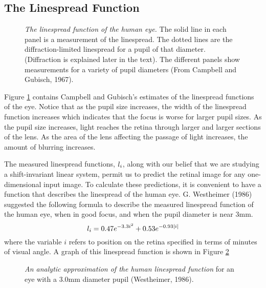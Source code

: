 \subsection*{The Linespread Function}
\begin{figure}
\centerline{
}
\caption[The Estimated Linespread Function]{ 
{\em The linespread function of the human eye.}
The solid line in each panel
is a measurement of the  linespread.
The dotted lines are the
diffraction-limited linespread for a pupil
of that diameter.
(Diffraction is explained later in the text).
The different panels show
measurements for a variety of pupil diameters
(From Campbell and Gubisch, 1967).
}
\label{f1:cg.linespread}
\end{figure}
Figure \ref{f1:cg.linespread} contains Campbell and Gubisch's
estimates of the linespread functions of the eye.
Notice that as the pupil size increases, the width of
the linespread function increases which indicates that
the focus is worse for larger pupil sizes.
As the pupil size increases, light reaches the retina
through larger and larger sections of the lens.
As the area of the lens affecting the passage of light
increases, the amount of blurring increases.

The measured linespread functions, $\mbox{$l_{i}$}$, along with
our belief that we are studying a shift-invariant linear system,
permit us to predict the retinal image
for any one-dimensional input image.
To calculate these predictions, it is convenient to
have a function that describes the linespread of the human eye.
G. Westheimer (1986) suggested the following formula
to describe the measured linespread function of the human eye, when
in good focus, and when the pupil diameter is near 3mm.
\begin{equation}
\mbox{$l_{i}$} = 0.47 e^{ - 3.3 i ^ {2} } + 0.53 e ^ { -0.93 | i | }
\end{equation}
where the variable $i$ refers to position on the
retina specified in terms of minutes of visual angle.
A graph of this
linespread function is shown in Figure \ref{f1:westheimer.ls}
\begin{figure}
\centerline{
}
\caption[Westheimer's Linespread Function]{ 
{\em An analytic approximation of the human linespread function}
for an eye with a 3.0mm diameter pupil (Westheimer, 1986).
}
\label{f1:westheimer.ls}
\end{figure}
\nocite{Westheimer1964}


